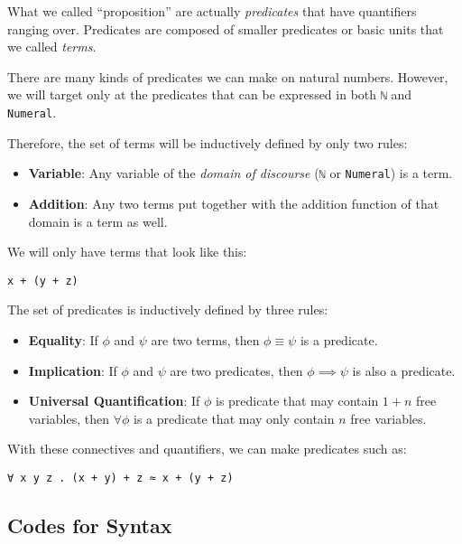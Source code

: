 \documentclass[\main/thesis.tex]{subfiles}
\begin{document}
What we called ``proposition'' are actually \textit{predicates} that have
quantifiers ranging over. Predicates are composed of smaller predicates or
basic units that we called \textit{terms}.

There are many kinds of predicates we can make on natural numbers.
However, we will target only at the predicates that can be expressed in both
\lstinline|ℕ| and \lstinline|Numeral|.

Therefore, the set of terms will be inductively defined by only two rules:
\begin{itemize}
    \item \textbf{Variable}: Any variable of the \textit{domain of discourse} (\lstinline|ℕ| or
        \lstinline|Numeral|) is a term.
    \item \textbf{Addition}: Any two terms put together with the addition function
        of that domain is a term as well.
\end{itemize}

We will only have terms that look like this:

\begin{lstlisting}
x + (y + z)
\end{lstlisting}

The set of predicates is inductively defined by three rules:

\begin{itemize}
    \item \textbf{Equality}: If $\phi$ and $\psi$ are two terms, then
        $ \phi \equiv \psi $ is a predicate.
    \item \textbf{Implication}: If $\phi$ and $\psi$ are two predicates, then
        $ \phi \implies \psi $ is also a predicate.
    \item \textbf{Universal Quantification}: If $\phi$ is predicate that may
        contain $ 1 + n $ free variables, then $ \forall \phi $ is a predicate that
        may only contain $ n $ free variables.
\end{itemize}

With these connectives and quantifiers, we can make predicates such as:

\begin{lstlisting}
∀ x y z . (x + y) + z ≈ x + (y + z)
\end{lstlisting}

\subsection{Codes for Syntax}
\end{document}
